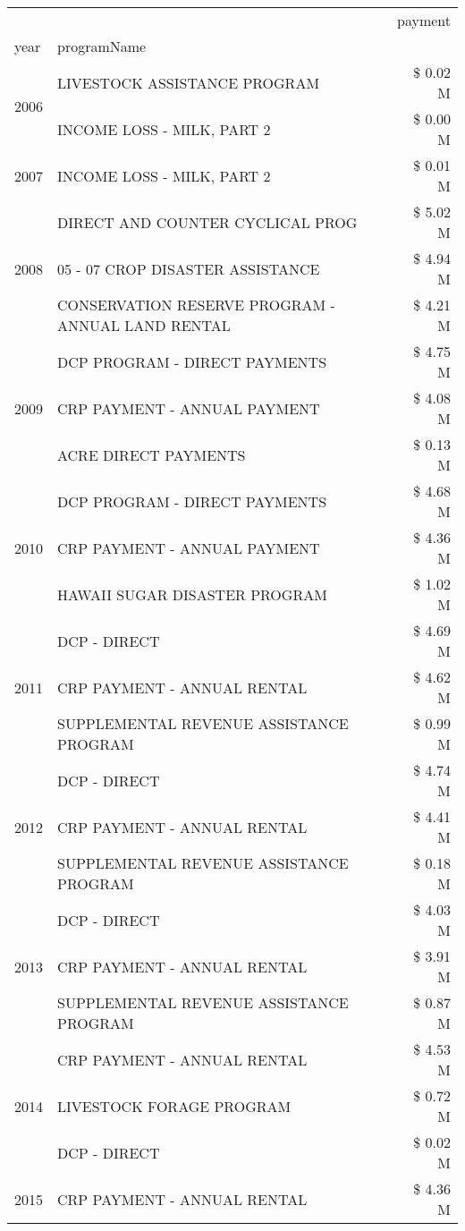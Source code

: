 \begin{tabular}{llr}
\toprule
 &  & payment \\
year & programName &  \\
\midrule
\multirow[t]{2}{*}{2006} & LIVESTOCK ASSISTANCE PROGRAM & \$ 0.02 M \\
 & INCOME LOSS - MILK, PART 2 & \$ 0.00 M \\
\cline{1-3}
2007 & INCOME LOSS - MILK, PART 2 & \$ 0.01 M \\
\cline{1-3}
\multirow[t]{3}{*}{2008} & DIRECT AND COUNTER CYCLICAL PROG & \$ 5.02 M \\
 & 05 - 07 CROP DISASTER ASSISTANCE & \$ 4.94 M \\
 & CONSERVATION RESERVE PROGRAM - ANNUAL LAND RENTAL & \$ 4.21 M \\
\cline{1-3}
\multirow[t]{3}{*}{2009} & DCP PROGRAM - DIRECT PAYMENTS & \$ 4.75 M \\
 & CRP PAYMENT - ANNUAL PAYMENT & \$ 4.08 M \\
 & ACRE DIRECT PAYMENTS & \$ 0.13 M \\
\cline{1-3}
\multirow[t]{3}{*}{2010} & DCP PROGRAM - DIRECT PAYMENTS & \$ 4.68 M \\
 & CRP PAYMENT - ANNUAL PAYMENT & \$ 4.36 M \\
 & HAWAII SUGAR DISASTER PROGRAM & \$ 1.02 M \\
\cline{1-3}
\multirow[t]{3}{*}{2011} & DCP - DIRECT & \$ 4.69 M \\
 & CRP PAYMENT - ANNUAL RENTAL & \$ 4.62 M \\
 & SUPPLEMENTAL REVENUE ASSISTANCE PROGRAM & \$ 0.99 M \\
\cline{1-3}
\multirow[t]{3}{*}{2012} & DCP - DIRECT & \$ 4.74 M \\
 & CRP PAYMENT - ANNUAL RENTAL & \$ 4.41 M \\
 & SUPPLEMENTAL REVENUE ASSISTANCE PROGRAM & \$ 0.18 M \\
\cline{1-3}
\multirow[t]{3}{*}{2013} & DCP - DIRECT & \$ 4.03 M \\
 & CRP PAYMENT - ANNUAL RENTAL & \$ 3.91 M \\
 & SUPPLEMENTAL REVENUE ASSISTANCE PROGRAM & \$ 0.87 M \\
\cline{1-3}
\multirow[t]{3}{*}{2014} & CRP PAYMENT - ANNUAL RENTAL & \$ 4.53 M \\
 & LIVESTOCK FORAGE PROGRAM & \$ 0.72 M \\
 & DCP - DIRECT & \$ 0.02 M \\
\cline{1-3}
\multirow[t]{3}{*}{2015} & CRP PAYMENT - ANNUAL RENTAL & \$ 4.36 M \\

\end{tabular}
